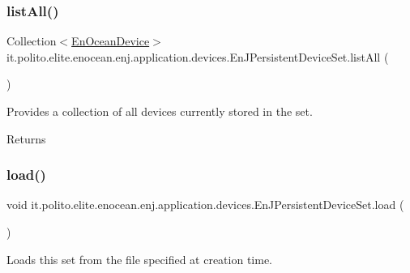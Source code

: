 \subsubsection{\texorpdfstring{list\+All()}{listAll()}}
{\footnotesize\ttfamily Collection$<$\hyperlink{classit_1_1polito_1_1elite_1_1enocean_1_1enj_1_1model_1_1_en_ocean_device}{En\+Ocean\+Device}$>$ it.\+polito.\+elite.\+enocean.\+enj.\+application.\+devices.\+En\+J\+Persistent\+Device\+Set.\+list\+All (\begin{DoxyParamCaption}{ }\end{DoxyParamCaption})}

Provides a collection of all devices currently stored in the set.

\begin{DoxyReturn}{Returns}

\end{DoxyReturn}
\hypertarget{classit_1_1polito_1_1elite_1_1enocean_1_1enj_1_1application_1_1devices_1_1_en_j_persistent_device_set_a13bc35a583634a2431401840653e26eb}{}\label{classit_1_1polito_1_1elite_1_1enocean_1_1enj_1_1application_1_1devices_1_1_en_j_persistent_device_set_a13bc35a583634a2431401840653e26eb} 
\subsubsection{\texorpdfstring{load()}{load()}\hspace{0.1cm}{\footnotesize\ttfamily [1/2]}}
{\footnotesize\ttfamily void it.\+polito.\+elite.\+enocean.\+enj.\+application.\+devices.\+En\+J\+Persistent\+Device\+Set.\+load (\begin{DoxyParamCaption}{ }\end{DoxyParamCaption})}

Loads this set from the file specified at creation time. \hypertarget{classit_1_1polito_1_1elite_1_1enocean_1_1enj_1_1application_1_1devices_1_1_en_j_persistent_device_set_a18a9c586f55a1184abf29ac3cf641f26}{}\label{classit_1_1polito_1_1elite_1_1enocean_1_1enj_1_1application_1_1devices_1_1_en_j_persistent_device_set_a18a9c586f55a1184abf29ac3cf641f26} 
